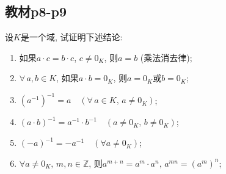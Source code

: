 \subsection{教材p8-p9}

\begin{problem}\label{ex:1.1.1}
    设$K$是一个域, 试证明下述结论:
    \begin{enumerate}[(1)]
        \item 如果$a \cdot c = b \cdot c$, $c \neq 0_K$, 则$a = b$ (乘法消去律);
        \item $\forall \, a, b \in K$, 如果$a \cdot b = 0_K$, 则$a = 0_K$或$b = 0_K$;
        \item $(a^{-1})^{-1} = a \quad (\forall \, a \in K ,\, a \neq 0_K)$;
        \item $(a \cdot b)^{-1} = a^{-1} \cdot b^{-1} \quad (a \neq 0_K ,\, b \neq 0_K)$;
        \item $(-a)^{-1} = -a^{-1} \quad (\forall a \neq 0_K)$;
        \item $\forall a \neq 0_K ,\, m, n \in \mathbb{Z}$, 则$a^{m + n} = a^m \cdot a^n ,\, a^{mn} = (a^m)^n$;
    \end{enumerate}
\end{problem}

